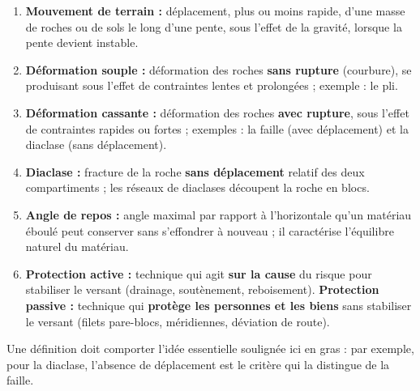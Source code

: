 \documentclass[11pt]{article}
\newcommand{\cle}[1]{{\popxbold\color{popdark}#1}}
\begin{document}
\begin{corrige}
\tcblower
\begin{enumerate}
\item \textbf{Mouvement de terrain :} déplacement, plus ou moins rapide, d'une masse de roches ou de sols le long d'une pente, sous l'effet de la gravité, lorsque la pente devient instable.
\item \textbf{Déformation souple :} déformation des roches \textbf{sans rupture} (courbure), se produisant sous l'effet de contraintes lentes et prolongées ; exemple : le \cle{pli}.
\item \textbf{Déformation cassante :} déformation des roches \textbf{avec rupture}, sous l'effet de contraintes rapides ou fortes ; exemples : la \cle{faille} (avec déplacement) et la \cle{diaclase} (sans déplacement).
\item \textbf{Diaclase :} fracture de la roche \textbf{sans déplacement} relatif des deux compartiments ; les réseaux de diaclases découpent la roche en blocs.
\item \textbf{Angle de repos :} angle maximal par rapport à l'horizontale qu'un matériau éboulé peut conserver sans s'effondrer à nouveau ; il caractérise l'équilibre naturel du matériau.
\item \textbf{Protection active :} technique qui agit \textbf{sur la cause} du risque pour stabiliser le versant (drainage, soutènement, reboisement). \textbf{Protection passive :} technique qui \textbf{protège les personnes et les biens} sans stabiliser le versant (filets pare-blocs, méridiennes, déviation de route).
\end{enumerate}
\end{corrige}
\begin{attention}
Une définition doit comporter l'idée essentielle soulignée ici en gras : par exemple, pour la diaclase, l'absence de déplacement est le critère qui la distingue de la faille.
\end{attention}
\end{document}
